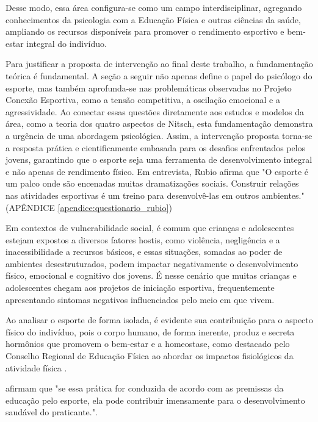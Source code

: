 \begin{Desenvolvimento}
Desse modo, essa área configura-se como um campo interdisciplinar, agregando conhecimentos da psicologia com a Educação Física e outras ciências da saúde, ampliando os recursos disponíveis para promover o rendimento esportivo e bem-estar integral do indivíduo.

Para justificar a proposta de intervenção ao final deste trabalho, a fundamentação teórica é fundamental. A seção a seguir não apenas define o papel do psicólogo do esporte, mas também aprofunda-se nas problemáticas observadas no Projeto Conexão Esportiva, como a tensão competitiva, a oscilação emocional e a agressividade. Ao conectar essas questões diretamente aos estudos e modelos da área, como a teoria dos quatro aspectos de Nitsch, esta fundamentação demonstra a urgência de uma abordagem psicológica. Assim, a intervenção proposta torna-se a resposta prática e cientificamente embasada para os desafios enfrentados pelos jovens, garantindo que o esporte seja uma ferramenta de desenvolvimento integral e não apenas de rendimento físico.
Em entrevista, Rubio afirma que "O esporte é um palco onde são encenadas muitas dramatizações sociais. Construir relações nas atividades esportivas é um treino para desenvolvê-las em outros ambientes." (APÊNDICE \ref{apendice:questionario_rubio})

Em contextos de vulnerabilidade social, é comum que crianças e adolescentes estejam expostos a diversos fatores hostis, como violência, negligência e a inacessibilidade a recursos básicos, e essas situações, somadas ao poder de ambientes desestruturados, podem impactar negativamente o desenvolvimento físico, emocional e cognitivo dos jovens. É nesse cenário que muitas crianças e adolescentes chegam aos projetos de iniciação esportiva, frequentemente apresentando sintomas negativos influenciados pelo meio em que vivem.

Ao analisar o esporte de forma isolada, é evidente sua contribuição para o aspecto físico do indivíduo, pois o corpo humano, de forma inerente, produz e secreta hormônios que promovem o bem-estar e a homeostase, como destacado pelo Conselho Regional de Educação Física ao abordar os impactos fisiológicos da atividade física .

 afirmam que "se essa prática for conduzida de acordo com as premissas da educação pelo esporte, ela pode contribuir imensamente para o desenvolvimento saudável do praticante.".


\end{Desenvolvimento}
